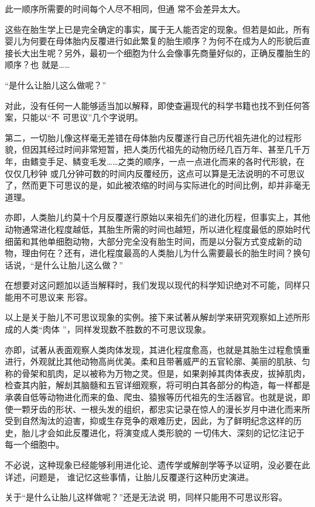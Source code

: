 \documentclass{article}
\begin{document}
此一顺序所需要的时间每个人尽不相同，但通
常不会差异太大。 

这些在胎生学上已是完全确定的事实，属于无人能否定的现象。但若是如此，所有婴儿为何要在母体胎内反覆进行如此繁复的胎生顺序？为何不在成为人的形貌后直接长大出生呢？另外，最初一个细胞为什么会像事先商量好似的，正确反覆胎生的顺序？也
就是…… 


“是什么让胎儿这么做呢？” 

对此，没有任何一人能够适当加以解释，即使查遍现代的科学书籍也找不到任何答案，只能以“不
可思议”几个字说明。 

第二，一切胎儿像这样毫无差错在母体胎内反覆遂行自己历代祖先进化的过程形貌，但因其经过时间非常短暂，把人类历代祖先的动物历经几百万年、甚至几千万年，由鳍变手足、鳞变毛发……之类的顺序，一点一点进化而来的各时代形貌，在仅仅几秒钟
\newpage
或几分钟可数的时间内反覆经历，这点可以算是无法说明的不可思议了，然而更下可思议的是，如此被浓缩的时间与实际进化的时间比例，却并非毫无道理。
 

亦即，人类胎儿约莫十个月反覆遂行原始以来祖先们的进化历程，但事实上，其他动物通常进化程度越低，其胎生所需的时间也越短，所以进化程度最低的原始时代细菌和其他单细胞动物，大部分完全没有胎生时间，而是以分裂方式变成新的动物，理由何在？还有，进化程度最高的人类胎儿为什么需要最长的胎生时间？换句话说，“是什么让胎儿这么做？”

在想要对这问题加以适当解释时，我们发现以现代的科学知识绝对不可能，同样只能用不可思议来
形容。 

以上是关于胎儿不可思议现象的实例。接下来试著从解刦学来研究观察如上述所形成的人类“肉体
”，同样发现数不胜数的不可思议现象。 

\newpage

亦即，试著从表面观察人类肉体发现，其进化程度愈高，也就是其胎生过程愈慎重进行，外观就比其他动物高尚优美。柔和且带著威严的五官轮廓、美丽的肌肤、匀称的骨架和肌肉，足以被称为万物之灵。但是，如果剥掉其肉体表皮，拔掉肌肉，检查其内脏，解刦其脑髓和五官详细观察，将可明白其各部分的构造，每一样都是承袭自低等动物进化而来的鱼、爬虫、猿猴等历代祖先的生活器官。也就是说，即使一颗牙齿的形状、一根头发的组织，都忠实记录在惊人的漫长岁月中进化而来所受到自然淘汰的迫害，抑或生存竞争的艰难历史，因此，为了鲜明纪念这样的历史，胎儿才会如此反覆进化，将演变成人类形貌的
一切伟大、深刻的记忆注记于每一个细胞中。 

不必说，这种现象已经能够利用进化论、遗传学或解剖学等予以证明，没必要在此详述，问题是，
谁记忆这些事情，让胎儿反覆遂行这种历史演进。 

关于“是什么让胎儿这样做呢？”还是无法说
明，同样只能用不可思议形容。 
\end{document}
